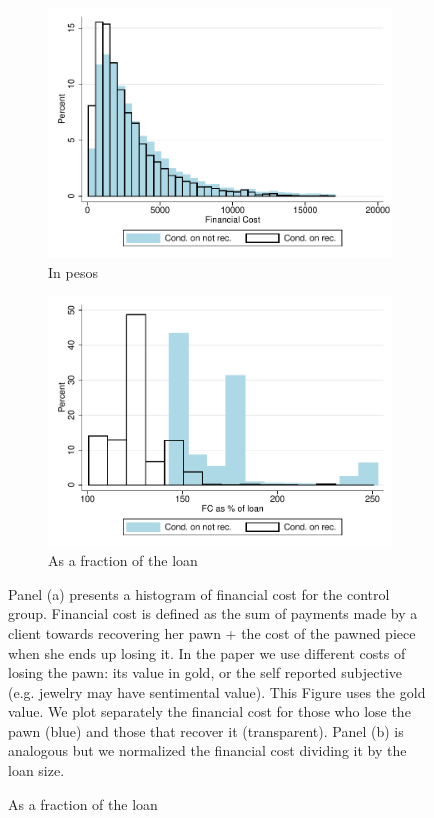 \documentclass[11pt]{article}
\begin{document}
\begin{figure}[H]
     \caption{Financial cost}
    \label{fc_hist}
    \begin{center}
    \begin{subfigure}{.45\textwidth}
      \caption{In pesos}
        \centering
        \includegraphics[width=\textwidth]{Figuras/hist_fc.pdf}
    \end{subfigure}
    \begin{subfigure}{0.45\textwidth}
    \caption{As a fraction of the loan}
       \centering
      \includegraphics[width=\textwidth]{Figuras/hist_fc_perc_loan.pdf}
    \end{subfigure}
    \end{center}
         \scriptsize
         Panel (a) presents a histogram of financial cost for the control group. Financial cost is defined as the sum of payments made by a client towards recovering her pawn + the cost of the pawned piece when she ends up losing it. In the paper we use different costs of losing the pawn: its value in gold, or the self reported subjective (e.g. jewelry may have sentimental value). This Figure uses the gold value. We plot separately the financial cost for those who lose the pawn (blue) and those that recover it (transparent).  Panel (b) is analogous but we normalized the financial cost dividing it by the loan size.  %

\end{figure}
\end{document}
